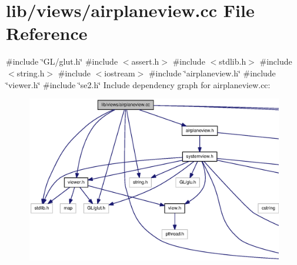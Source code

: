 \section{lib/views/airplaneview.cc \-File \-Reference}
\label{airplaneview_8cc}
{\ttfamily \#include \char`\"{}\-G\-L/glut.\-h\char`\"{}}\*
{\ttfamily \#include $<$assert.\-h$>$}\*
{\ttfamily \#include $<$stdlib.\-h$>$}\*
{\ttfamily \#include $<$string.\-h$>$}\*
{\ttfamily \#include $<$iostream$>$}\*
{\ttfamily \#include \char`\"{}airplaneview.\-h\char`\"{}}\*
{\ttfamily \#include \char`\"{}viewer.\-h\char`\"{}}\*
{\ttfamily \#include \char`\"{}se2.\-h\char`\"{}}\*
\-Include dependency graph for airplaneview.\-cc\-:\nopagebreak
\begin{figure}[H]
\begin{center}
\leavevmode
\includegraphics[width=350pt]{airplaneview_8cc__incl}
\end{center}
\end{figure}
